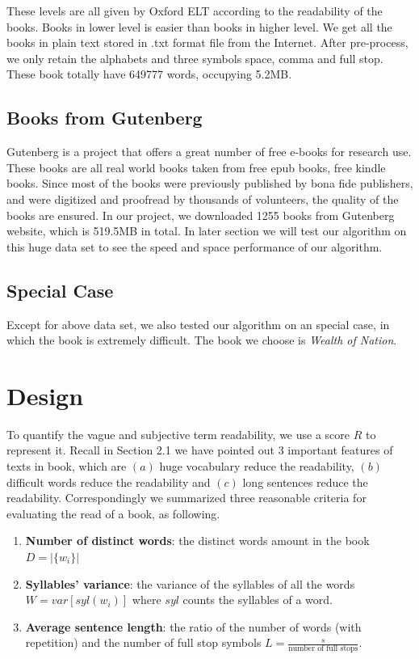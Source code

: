 \documentclass{article}
\begin{document}
These levels are all given by Oxford ELT according to the readability of the books. Books in lower level is easier than books in higher level.
\newline
\newline
We get all the books in plain text stored in .txt format file from the Internet. After pre-process, we only retain the alphabets and three symbols space, comma and full stop. These book totally have 649777 words, occupying 5.2MB.

\subsection{Books from Gutenberg}
Gutenberg is a project that offers a great number of free e-books for research use. These books are all real world books taken from free epub books, free kindle books. Since most of the books were previously published by bona fide publishers, and were digitized and proofread by thousands of volunteers, the quality of the books are ensured.
\newline
\newline
In our project, we downloaded 1255 books from Gutenberg website, which is 519.5MB in total. In later section we will test our algorithm on this huge data set to see the speed and space performance of our algorithm.

\subsection{Special Case}
Except for above data set, we also tested our algorithm on an special case, in which the book is extremely difficult. The book we choose is \textit{Wealth of Nation}\cite{wealth}.


\section{Design}
	To quantify the vague and subjective term readability, we use a score $R$ to represent it. Recall in Section 2.1 we have pointed out 3 important features of texts in book, which are $(a)$ huge vocabulary reduce the readability, $(b)$ difficult words reduce the readability and $(c)$ long sentences reduce the readability. Correspondingly we summarized three reasonable criteria for evaluating the read of a book, as following.
	\begin{enumerate}
		\item \textbf{Number of distinct words}: the distinct words amount in the book $D = |\{w_i\}|$
		\item \textbf{Syllables' variance}: the variance of the syllables of all the words 
			$W = var[syl(w_i)]$ where $syl$ counts the syllables of a word.
		\item \textbf{Average sentence length}: the ratio of the number of words (with repetition) and the number of full stop symbols
			$L = \frac{s}{\textrm{number of full stops}}$.
	\end{enumerate}
	
\end{document}
